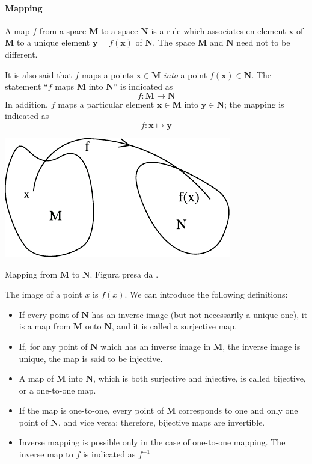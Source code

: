 \documentclass[../main.tex]{subfiles}
\begin{document}
\paragraph{Mapping }
\begin{definition}
A map $f$ from a space $\mathbf{M}$ to a space $\mathbf{N}$ is a rule which associates en element $\mathbf{x}$ of $\mathbf{M}$ to a unique element $\mathbf{y}=f(\mathbf{x})$ of $\mathbf{N}$. The space $\mathbf{M}$ and $\mathbf{N}$ need not to be different.
\end{definition}
It is also said that $f$ maps a points $\mathbf{x} \in \mathbf{M}$ \textit{into} a point $f(\mathbf{x}) \in \mathbf{N}$. The statement “$f$ maps $\mathbf{M}$ into $\mathbf{N}$” is indicated as \[f : \mathbf{M} \rightarrow  \mathbf{N}\]
In addition, $f$ maps a particular element $\mathbf{x} \in \mathbf{M}$ into $\mathbf{y} \in \mathbf{N}$; the mapping is indicated as
\[
f : \mathbf{x} \mapsto  \mathbf{y}
\]\begin{marginfigure}[15mm]
	\includegraphics{images/mappa_vettoriale.pdf}
	\caption[Mapping from $\mathbf{M}$ to $\mathbf{M}$]{Mapping from $\mathbf{M}$ to $\mathbf{N}$. Figura presa da \cite{ferrari2020general}.}
\end{marginfigure}The image of a point $x$ is $f(x)$. We can introduce the following definitions:
\begin{itemize}
    \item If every point of $\mathbf{N}$ has an inverse image (but not necessarily a unique one), it is a map from $\mathbf{M}$ onto $\mathbf{N}$, and it is called a surjective map.
    \item If, for any point of $\mathbf{N}$ which has an inverse image in $\mathbf{M}$, the inverse image is unique, the map is said to be injective.
    \item A map of $\mathbf{M}$ into $\mathbf{N}$, which is both surjective and injective, is called bijective, or a one-to-one map.
    \item If the map is one-to-one, every point of $\mathbf{M}$ corresponds to one and only one point of $\mathbf{N}$, and vice versa; therefore, bijective maps are invertible.
    \item Inverse mapping is possible only in the case of one-to-one mapping. The inverse map to $f$ is indicated as $f^{-1}$
\end{itemize}
\end{document}
